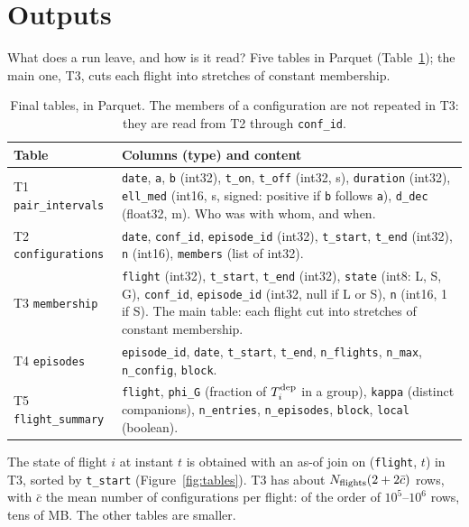 \section{Outputs}\label{sec:outputs}

What does a run leave, and how is it read? Five tables in Parquet (Table~\ref{tab:outputs});
the main one, T3, cuts each flight into stretches of constant membership.

\begin{table}
\centering
\small
\begin{tabularx}{\textwidth}{@{}l X@{}}
\toprule
Table & Columns (type) and content \\
\midrule
T1 \texttt{pair\_intervals} & \texttt{date}, \texttt{a}, \texttt{b} (int32), \texttt{t\_on}, \texttt{t\_off} (int32, s),
  \texttt{duration} (int32), \texttt{ell\_med} (int16, s, signed: positive if \texttt{b} follows \texttt{a}),
  \texttt{d\_dec} (float32, m). Who was with whom, and when. \\ \addlinespace
T2 \texttt{configurations} & \texttt{date}, \texttt{conf\_id}, \texttt{episode\_id} (int32), \texttt{t\_start},
  \texttt{t\_end} (int32), \texttt{n} (int16), \texttt{members} (list of int32). \\ \addlinespace
T3 \texttt{membership} & \texttt{flight} (int32), \texttt{t\_start}, \texttt{t\_end} (int32), \texttt{state} (int8:
  L, S, G), \texttt{conf\_id}, \texttt{episode\_id} (int32, null if L or S), \texttt{n} (int16, 1 if S).
  The main table: each flight cut into stretches of constant membership. \\ \addlinespace
T4 \texttt{episodes} & \texttt{episode\_id}, \texttt{date}, \texttt{t\_start}, \texttt{t\_end}, \texttt{n\_flights},
  \texttt{n\_max}, \texttt{n\_config}, \texttt{block}. \\ \addlinespace
T5 \texttt{flight\_summary} & \texttt{flight}, \texttt{phi\_G} (fraction of $T^{\mathrm{dep}}_i$ in a group), \texttt{kappa}
  (distinct companions), \texttt{n\_entries}, \texttt{n\_episodes}, \texttt{block}, \texttt{local} (boolean). \\
\bottomrule
\end{tabularx}
\caption{Final tables, in Parquet. The members of a configuration are not repeated in T3: they are
read from T2 through \texttt{conf\_id}.}
\label{tab:outputs}
\end{table}

The state of flight $i$ at instant $t$ is obtained with an as-of join on (\texttt{flight}, $t$)
in T3, sorted by \texttt{t\_start} (Figure~\ref{fig:tables}). T3 has about
$N_{\rm flights}(2+2\bar c)$ rows, with $\bar c$ the mean number of configurations per flight:
of the order of $10^5$--$10^6$ rows, tens of MB. The other tables are smaller.

